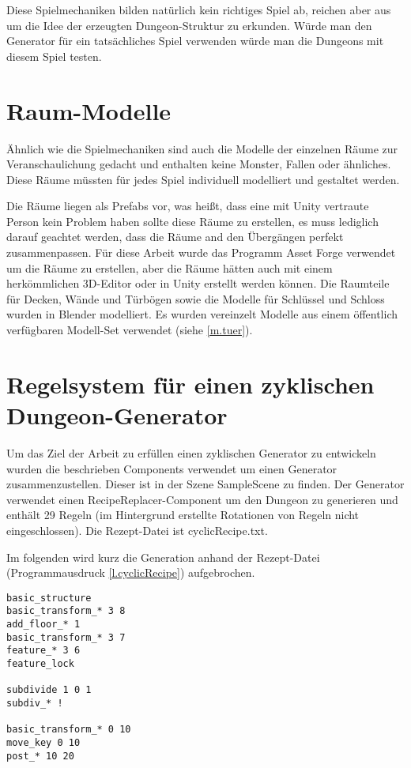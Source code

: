 Diese Spielmechaniken bilden natürlich kein richtiges Spiel ab, reichen aber aus um die Idee der erzeugten Dungeon-Struktur zu erkunden. Würde man den Generator für ein tatsächliches Spiel verwenden würde man die Dungeons mit diesem Spiel testen.

\section{Raum-Modelle}

Ähnlich wie die Spielmechaniken sind auch die Modelle der einzelnen Räume zur Veranschaulichung gedacht und enthalten keine Monster, Fallen oder ähnliches. Diese Räume müssten für jedes Spiel individuell modelliert und gestaltet werden. 


Die Räume liegen als Prefabs vor, was heißt, dass eine mit Unity vertraute Person kein Problem haben sollte diese Räume zu erstellen, es muss lediglich darauf geachtet werden, dass die Räume and den Übergängen perfekt zusammenpassen. Für diese Arbeit wurde das Programm Asset Forge verwendet um die Räume zu erstellen, aber die Räume hätten auch mit einem herkömmlichen 3D-Editor oder in Unity erstellt werden können. Die Raumteile für Decken, Wände und Türbögen sowie die Modelle für Schlüssel und Schloss wurden in Blender modelliert. Es wurden vereinzelt Modelle aus einem öffentlich verfügbaren Modell-Set verwendet (siehe \ref{m.tuer}).

\section{Regelsystem für einen zyklischen Dungeon-Generator}\label{s.regelsystem}

Um das Ziel der Arbeit zu erfüllen einen zyklischen Generator zu entwickeln wurden die beschrieben Components verwendet um einen Generator zusammenzustellen. Dieser ist in der Szene SampleScene zu finden. Der Generator verwendet einen RecipeReplacer-Component um den Dungeon zu generieren und enthält 29 Regeln (im Hintergrund erstellte Rotationen von Regeln nicht eingeschlossen).  Die Rezept-Datei ist cyclicRecipe.txt.

Im folgenden wird kurz die Generation anhand der Rezept-Datei (Programmausdruck \ref{l.cyclicRecipe}) aufgebrochen.

\begin{lstlisting}[label=l.cyclicRecipe, caption={Rezept-Datei des Generators}] 
basic_structure
basic_transform_* 3 8
add_floor_* 1
basic_transform_* 3 7
feature_* 3 6
feature_lock

subdivide 1 0 1
subdiv_* !

basic_transform_* 0 10
move_key 0 10
post_* 10 20
\end{lstlisting}

